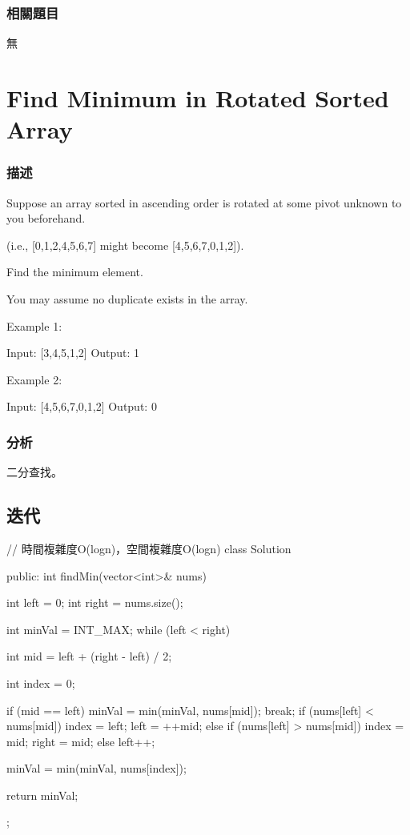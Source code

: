 \subsubsection{相關題目}
\begindot
\item 無
\myenddot

\section{Find Minimum in Rotated Sorted Array} %
\label{sec:find-minium-in-rotated-sorted-array}


\subsubsection{描述}
Suppose an array sorted in ascending order is rotated at some pivot unknown to you beforehand.

(i.e.,  [0,1,2,4,5,6,7] might become  [4,5,6,7,0,1,2]).

Find the minimum element.

You may assume no duplicate exists in the array.

Example 1:
\begin{Code}
Input: [3,4,5,1,2] 
Output: 1
\end{Code}

Example 2:
\begin{Code}
Input: [4,5,6,7,0,1,2]
Output: 0
\end{Code}

\subsubsection{分析}
二分查找。


\subsection{迭代}
\begin{Code}
// 時間複雜度O(logn)，空間複雜度O(logn)
class Solution {
public:
    int findMin(vector<int>& nums) {
        int left = 0;
        int right = nums.size();

        int minVal = INT_MAX;
        while (left < right) {
            int mid = left + (right - left) / 2;

            int index = 0;

            if (mid == left) {
                minVal = min(minVal, nums[mid]);
                break;
            }
            if (nums[left] < nums[mid]) {
                index = left;
                left = ++mid;
            }
            else if (nums[left] > nums[mid]) {
                index = mid;
                right = mid;
            }
            else
                left++;

            minVal = min(minVal, nums[index]);
        }

        return minVal;
    }
};
\end{Code}
